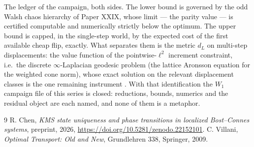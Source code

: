 \documentclass[11pt]{amsart}
\theoremstyle{remark}
\begin{document}
The ledger of the campaign, both sides. The lower bound is governed by the odd Walsh
chaos hierarchy of Paper XXIX, whose limit --- the parity value --- is certified
computable and numerically strictly below the optimum. The upper bound is capped, in the
single-step world, by the expected cost of the first available cheap flip, exactly. What
separates them is the metric $d_L$ on multi-step displacements: the value function of
the pointwise-$\ell^2$ increment constraint, i.e.\ the discrete $\infty$-Laplacian
geodesic problem (the lattice Aronsson equation for the weighted cone norm), whose exact
solution on the relevant displacement classes is the one remaining instrument
\cite{Villani}. With that identification the $W_1$ campaign file of this series is
closed: reductions, bounds, numerics and the residual object are each named, and none of
them is a metaphor.

\begin{thebibliography}{9}
 R. Chen, \emph{KMS state uniqueness and phase transitions in localized Bost--Connes systems}, preprint, 2026, \newline\url{https://doi.org/10.5281/zenodo.22152101}.
 C. Villani, \emph{Optimal Transport: Old and New}, Grundlehren 338, Springer, 2009.
\end{thebibliography}
\end{document}
